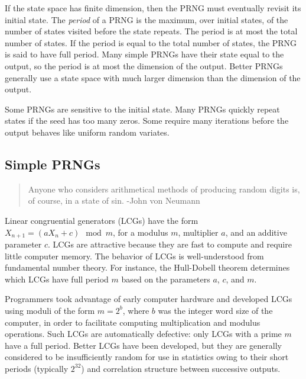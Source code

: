\documentclass[graybox]{svmult}
\begin{document}
If the state space has finite dimension, then the PRNG must eventually revisit its initial state.
The \emph{period} of a PRNG is the maximum, over initial states, of the number of states visited before the state repeats.
The period is at most the total number of states.
If the period is equal to the total number of states, the PRNG is said to have full period.
Many simple PRNGs have their state equal to the output, so the period is at most the dimension of the output.
Better PRNGs generally use a state space with much larger dimension than the dimension of the output.

Some PRNGs are sensitive to the initial state.
Many PRNGs quickly repeat states if the seed has too many zeros.
Some require many iterations before the output behaves like uniform random variates.


\subsection{Simple PRNGs}

\begin{quotation}
Anyone who considers arithmetical methods of producing random digits is, of course, in a state of sin.  -John von Neumann
\end{quotation}


Linear congruential generators (LCGs) have the form $X_{n+1} = (a X_n + c) \mod m$, for a modulus $m$, 
multiplier $a$, and an additive parameter $c$.
LCGs are attractive because they are fast to compute and require little computer memory.
The behavior of LCGs is well-understood from fundamental number theory.
For instance, the Hull-Dobell theorem determines which LCGs have full period $m$ based on the parameters $a$, $c$, and $m$.
%

Programmers took advantage of early computer hardware and developed LCGs using moduli of the form $m = 2^b$, where
$b$ was the integer word size of the computer, in order to facilitate computing multiplication and modulus operations.
Such LCGs are automatically defective: only LCGs with a prime $m$ have a full period.
Better LCGs have been developed, but they are generally considered to be insufficiently random for use in statistics owing to their short periods (typically $2^{32}$) and correlation structure between successive outputs.
\end{document}
